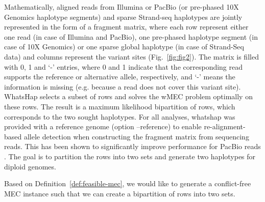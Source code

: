 Mathematically, aligned reads from Illumina or PacBio (or pre-phased 10X Genomics haplotype segments) and sparse Strand-seq haplotypes are jointly represented in the form of a fragment matrix, where each  row represent either one read (in case of Illumina and PacBio), 
one pre-phased haplotype segment (in case of 10X Genomics) or one sparse global haplotype (in case of Strand-Seq data) and columns represent the variant sites (Fig.~\ref{fig:fig2}). 
The matrix is filled with 0, 1 and ‘-’ entries, where 0 and 1 indicate that the corresponding read supports the reference or alternative allele, respectively,  and ‘-’ means the information is missing 
(e.g. because a read does not cover this variant site). WhatsHap selects a subset of rows and solves the wMEC problem optimally on these rows. 
The result is a maximum likelihood bipartition of rows, which corresponds to the two sought haplotypes.
For all analyses, whatshap was provided with a reference genome (option --reference) to enable re-alignment-based allele detection when constructing the fragment matrix from sequencing reads. 
This has been shown to significantly improve performance for PacBio reads \citep{martin2016whatshap}.
The goal is to partition the rows into two sets and generate two haplotypes for diploid genomes.

Based on Definition~\ref{def:feasible-mec}, we would like to generate a conflict-free MEC instance such that we can create a bipartition of rows into two sets. 
% 
